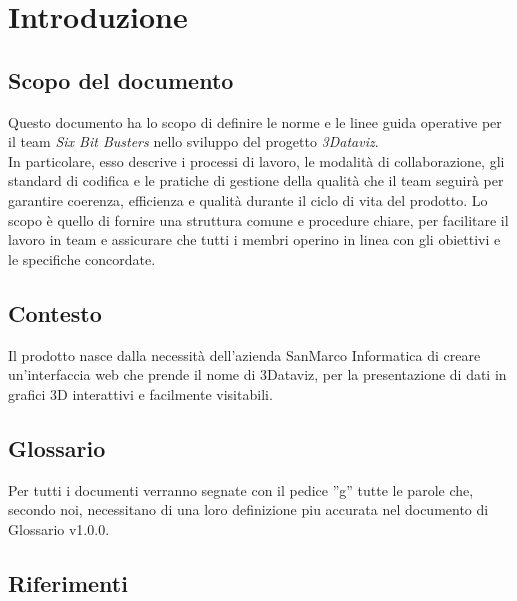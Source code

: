 \section{Introduzione}
    \subsection{Scopo del documento}
        Questo documento ha lo scopo di definire le norme e le linee guida operative
        per il team \textit{Six Bit Busters} nello sviluppo del progetto
        \textit{3Dataviz}.\\ In particolare, esso descrive i processi di lavoro,
        le modalità di collaborazione, gli standard di codifica e le pratiche
        di gestione della qualità che il team seguirà per garantire coerenza, 
        efficienza e qualità durante il ciclo di vita del prodotto. 
        Lo scopo è quello di fornire una struttura comune e procedure chiare, per 
        facilitare il lavoro in team e assicurare che tutti i membri operino in 
        linea con gli obiettivi e le specifiche concordate.

    \subsection{Contesto}
        Il prodotto nasce dalla necessità dell'azienda SanMarco Informatica di 
        creare un'interfaccia web che prende il nome di 3Dataviz, per la presentazione di dati in grafici 3D interattivi
        e facilmente visitabili.
    \subsection{Glossario}
        Per tutti i documenti verranno segnate con il pedice ”g” tutte le parole che, secondo noi, necessitano di
        una loro definizione piu accurata nel documento di Glossario v1.0.0.
    \subsection{Riferimenti}